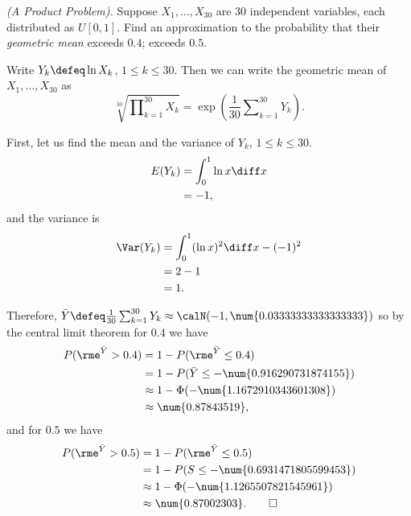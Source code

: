 \begin{problem}[Handout 14, \# 8]
  \emph{(A Product Problem).} Suppose \(X_1,\dotsc,X_{30}\) are \(30\)
  independent variables, each distributed as \(U[0,1]\). Find an
  approximation to the probability that their \emph{geometric mean} exceeds
  \(0.4\); exceeds \(0.5\).
\end{problem}
\begin{solution}
  Write \(Y_k\defeq \ln X_k\), \(1\leq k\leq 30\). Then we can write the
  geometric mean of \(X_1,\dotsc,X_{30}\) as
  \[
    \sqrt[30]{\prod\nolimits_{k=1}^{30} X_k}
    =\exp\left(\frac{1}{30}\sum\nolimits_{k=1}^{30} Y_k\right).
  \]

  First, let us find the mean and the variance of \(Y_k\), \(1\leq k\leq
  30\).
  \begin{align*}
    E(Y_k)
    &=\int_0^1 \ln x\diff x\\
    &=-1,
  \end{align*}
  and the variance is
  \begin{align*}
    \Var(Y_k)
    &=\int_0^1 (\ln x)^2\diff x-(-1)^2\\
    &=2-1\\
    &=1.
  \end{align*}

  Therefore,
  \(\bar Y\defeq
  \frac{1}{30}\sum_{k=1}^{30}Y_k\approx\calN(-1,\num{0.03333333333333333})\)
  so by the central limit theorem for \(0.4\) we have
  \begin{align*}
    P(\rme^{\bar Y}>0.4)
    &=1-P(\rme^{\bar Y}\leq 0.4)\\
    &=1-P(\bar Y\leq-\num{0.916290731874155})\\
    &\approx 1-\Phi(-\num{1.1672910343601308})\\
    &\approx\num{0.87843519},
  \end{align*}
  and for \(0.5\) we have
  \begin{align*}
    P(\rme^{\bar Y}>0.5)
    &=1-P(\rme^{\bar Y}\leq 0.5)\\
    &=1-P(S\leq-\num{0.6931471805599453})\\
    &\approx 1-\Phi(-\num{1.1265507821545961})\\
    &\approx\num{0.87002303}.\qedhere
  \end{align*}
\end{solution}
\newpage

